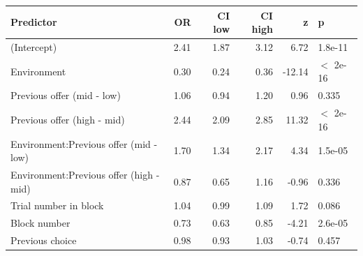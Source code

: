 \begin{table}[ht]
\centering
\begin{tabular}{lrrrrl}
  \hline
Predictor & OR & CI low & CI high & z & p \\ 
  \hline
(Intercept) & 2.41 & 1.87 & 3.12 & 6.72 & 1.8e-11 \\ 
  Environment & 0.30 & 0.24 & 0.36 & -12.14 & $<$ 2e-16 \\ 
  Previous offer (mid - low) & 1.06 & 0.94 & 1.20 & 0.96 & 0.335 \\ 
  Previous offer (high - mid) & 2.44 & 2.09 & 2.85 & 11.32 & $<$ 2e-16 \\ 
  Environment:Previous offer (mid - low) & 1.70 & 1.34 & 2.17 & 4.34 & 1.5e-05 \\ 
  Environment:Previous offer (high - mid) & 0.87 & 0.65 & 1.16 & -0.96 & 0.336 \\ 
  Trial number in block & 1.04 & 0.99 & 1.09 & 1.72 & 0.086 \\ 
  Block number & 0.73 & 0.63 & 0.85 & -4.21 & 2.6e-05 \\ 
  Previous choice & 0.98 & 0.93 & 1.03 & -0.74 & 0.457 \\ 
   \hline
\end{tabular}
\end{table}
